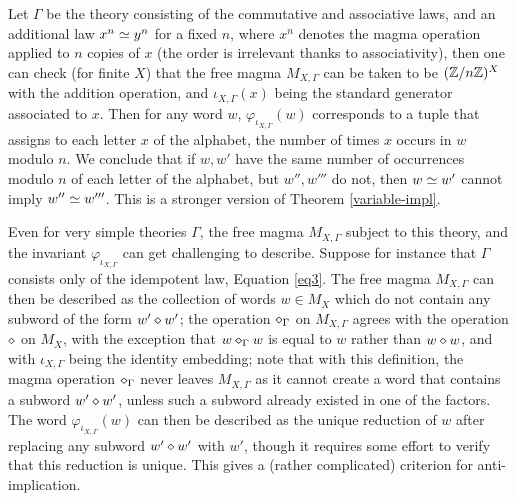 \begin{example} Let $\Gamma$ be the theory consisting of the commutative and associative laws, and an additional law $x^n \simeq y^n$ for a fixed $n$, where $x^n$ denotes the magma operation applied to $n$ copies of $x$ (the order is irrelevant thanks to associativity), then one can check (for finite $X$) that the free magma $M_{X,\Gamma}$ can be taken to be $(\mathbb{Z}/n\mathbb{Z})^X$ with the addition operation, and $\iota_{X,\Gamma}(x)$ being the standard generator associated to $x$.  Then for any word $w$, $\varphi_{\iota_{X,\Gamma}}(w)$ corresponds to a tuple that assigns to each letter $x$ of the alphabet, the number of times $x$ occurs in $w$ modulo $n$.  We conclude that if $w,w'$ have the same number of occurrences modulo $n$ of each letter of the alphabet, but $w'', w'''$ do not, then $w \simeq w'$ cannot imply $w'' \simeq w'''$.  This is a stronger version of Theorem \ref{variable-impl}.
\end{example}

Even for very simple theories $\Gamma$, the free magma $M_{X,\Gamma}$ subject to this theory, and the invariant $\varphi_{\iota_{X,\Gamma}}$ can get challenging to describe. Suppose for instance that $\Gamma$ consists only of the idempotent law, Equation \ref{eq3}.  The free magma $M_{X,\Gamma}$ can then be described as the collection of words $w \in M_X$ which do not contain any subword of the form $w' \diamond w'$; the operation $\diamond_\Gamma$ on $M_{X,\Gamma}$ agrees with the operation $\diamond$ on $M_X$, with the exception that $w \diamond_\Gamma w$ is equal to $w$ rather than $w \diamond w$, and with $\iota_{X,\Gamma}$ being the identity embedding; note that with this definition, the magma operation $\diamond_\Gamma$ never leaves $M_{X,\Gamma}$ as it cannot create a word that contains a subword $w' \diamond w'$, unless such a subword already existed in one of the factors.  The word $\varphi_{\iota_{X,\Gamma}}(w)$ can then be described as the unique reduction of $w$ after replacing any subword $w' \diamond w'$ with $w'$, though it requires some effort to verify that this reduction is unique.  This gives a (rather complicated) criterion for anti-implication.
